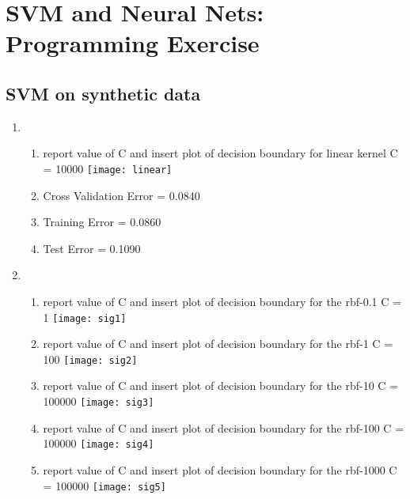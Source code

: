 \documentclass[english]{article}
\begin{document}
\section{SVM and Neural Nets: Programming Exercise}
\subsection{SVM on synthetic data}
\begin{enumerate}
\item
\begin{enumerate}
\item report value of C and insert plot of decision boundary for linear kernel \newline
C = 10000\newline
\texttt{[image: linear]}\newline

\item Cross Validation Error = 0.0840
\item Training Error = 0.0860
\item Test Error = 0.1090

\end{enumerate}
\item 
\begin{enumerate}

\item report value of C and insert plot of decision boundary for the rbf-0.1 \newline
C = 1\newline
\texttt{[image: sig1]}\newline
\item report value of C and insert plot of decision boundary for the rbf-1\newline
C = 100\newline
\texttt{[image: sig2]}\newline
\item report value of C and insert plot of decision boundary for the rbf-10\newline
C = 100000\newline
\texttt{[image: sig3]}\newline
\item report value of C and insert plot of decision boundary for the rbf-100\newline
C = 100000\newline
\texttt{[image: sig4]}\newline
\item report value of C and insert plot of decision boundary for the rbf-1000 \newline
C = 100000\newline
\texttt{[image: sig5]}\newline


\end{enumerate}
\end{enumerate}
\end{document}
